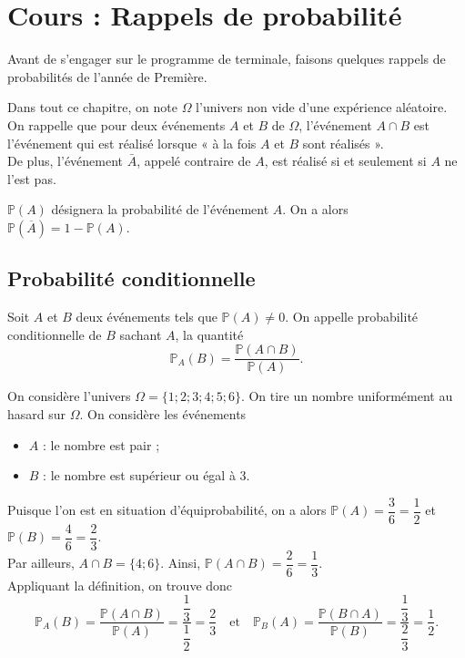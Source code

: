 \documentclass[11pt,fleqn, openany]{book} %
\begin{document}

\chapter{Cours : Rappels de probabilité}



Avant de s'engager sur le programme de terminale, faisons quelques rappels de probabilités de l'année de Première.

Dans tout ce chapitre, on note $\Omega$ l'univers non vide d'une expérience aléatoire.\\
On rappelle que pour deux événements $A$ et $B$ de $\Omega$, l'événement $A \cap B$ est l'événement qui est réalisé lorsque « à la fois $A$ et $B$ sont réalisés ».\\De plus, l'événement $\bar{A}$, appelé contraire de $A$, est réalisé si et seulement si $A$ ne l'est pas.

$\mathbb{P}(A)$ désignera la probabilité de l'événement $A$. On a alors $\mathbb{P}(\overline{A})=1-\mathbb{P}(A)$.


\section{Probabilité conditionnelle}

\begin{definition}Soit $A$ et $B$ deux événements tels que $\mathbb{P}(A)\neq 0$. On appelle probabilité conditionnelle de $B$ sachant $A$, la quantité
\[ \mathbb{P}_A(B)=\dfrac{\mathbb{P}(A\cap B)}{\mathbb{P}(A)}.\]\end{definition}

\begin{example} On considère l'univers $\Omega = \{ 1;2;3;4;5;6\}$. On tire un nombre uniformément au hasard sur $\Omega$. On  considère les événements
\begin{itemize}
\item $A$ : le nombre est pair ;
\item $B$ : le nombre est supérieur ou égal à 3.
\end{itemize}
Puisque l'on est en situation d'équiprobabilité, on a alors $\mathbb{P}(A)=\dfrac{3}{6}=\dfrac{1}{2}$ et $\mathbb{P}(B)=\dfrac{4}{6}=\dfrac{2}{3}$.\\
Par ailleurs, $A\cap B = \{4;6\}$. Ainsi, $\mathbb{P}(A \cap B) = \dfrac{2}{6}=\dfrac{1}{3}$.\\
Appliquant la définition, on trouve donc 
\[ \mathbb{P}_A(B)=\dfrac{\mathbb{P}(A\cap B)}{\mathbb{P}(A)}=\dfrac{\dfrac{1}{3}}{\dfrac{1}{2}}=\dfrac{2}{3}\quad
\text{et} 
\quad \mathbb{P}_B(A)=\dfrac{\mathbb{P}(B\cap A)}{\mathbb{P}(B)}=\dfrac{\dfrac{1}{3}}{\dfrac{2}{3}}=\dfrac{1}{2}.\]
\end{example}
\end{document}
